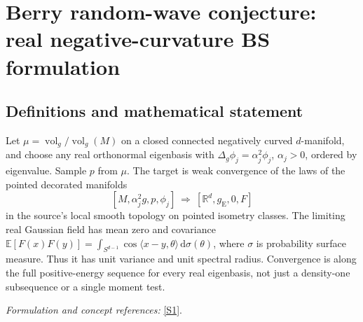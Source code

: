 \documentclass[11pt,a4paper]{article}
\newcommand{\R}{\mathbb{R}}
\newcommand{\E}{\mathbb{E}}
\newcommand{\dd}{\,\mathrm d}
\newcommand{\sref}[2]{\hyperlink{source:#1:#2}{[S#2]}}
\newif\ifshowcatalogue
\newcommand{\cataloguescope}[1]{\ifshowcatalogue
 \paragraph{Exact scope in the supplied catalogue.}
 \begin{quote}\small #1\end{quote}\fi}
\numberwithin{equation}{section}
\begin{document}
\setcounter{section}{0}
\clearpage
\section*{\texorpdfstring{Berry random-wave conjecture: real negative-curvature BS formulation}{Berry random-wave conjecture: real negative-curvature BS formulation}}\label{30006801}
\subsection{Definitions and mathematical statement}
Let $\mu=\operatorname{vol}_g/\operatorname{vol}_g(M)$ on a closed connected negatively curved $d$-manifold, and choose any real orthonormal eigenbasis with
$\Delta_g\phi_j=\alpha_j^2\phi_j$, $\alpha_j>0$, ordered by eigenvalue. Sample $p$ from $\mu$. The target is weak convergence of the laws of the pointed decorated manifolds
\[
 [M,\alpha_j^2g,p,\phi_j]\ \Longrightarrow\ [\R^d,g_{\mathrm E},0,F]
\]
in the source's local smooth topology on pointed isometry classes. The limiting real Gaussian field has mean zero and covariance
$\E[F(x)F(y)]=\int_{S^{d-1}}\cos\langle x-y,\theta\rangle\dd\sigma(\theta)$,
where $\sigma$ is probability surface measure. Thus it has unit variance and unit spectral radius. Convergence is along the full positive-energy sequence for every real eigenbasis, not just a density-one subsequence or a single moment test.
\par\smallskip\textit{Formulation and concept references:} \sref{30006801}{1}.
\cataloguescope{For every closed connected smooth Riemannian manifold (M,g) of dimension d>=2 with everywhere strictly negative sectional curvature, put mu=dvol\_g/vol\_g(M). For any real orthonormal eigenbasis of L2(M,mu) for the positive Laplace-Beltrami operator, order the eigenvalues nondecreasingly and omit the finite zero-eigenspace; write Delta\_g phi\_j=alpha\_j\textasciicircum{}2 phi\_j with alpha\_j>0. If p is sampled with law mu, does the law of the pointed real-decorated manifold [M,alpha\_j\textasciicircum{}2 g,p,phi\_j] converge weakly, along the full positive-energy sequence, in Abert-Bergeron-Le Masson's local smooth topology on pointed isometry classes of real-decorated d-manifolds, to the law of [R\textasciicircum{}d,g\_Euclidean,0,F]? Here F is the centered real stationary isotropic Gaussian field with covariance E[F(x)F(y)]=integral\_\{S\textasciicircum{}\{d-1\}\} cos(<x-y,theta>) d sigma(theta), where sigma is probability surface measure on the unit sphere (unit variance and unit spectral radius, no extra 2*pi factor).}
\end{document}
